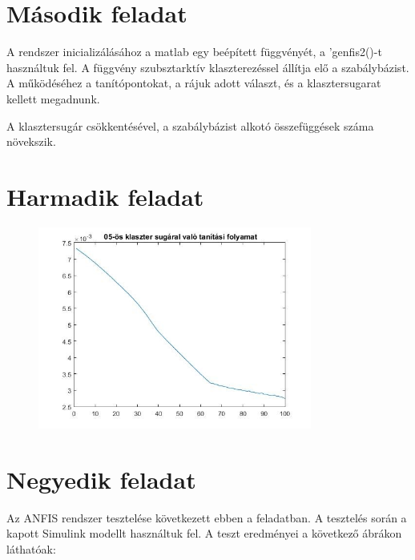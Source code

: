 \section{Második feladat}
A rendszer inicializálásához a matlab egy beépített függvényét, a ’genfis2()-t használtuk fel. A függvény szubsztarktív klaszterezéssel állítja elő a szabálybázist. A működéséhez a tanítópontokat, a rájuk adott választ, és a klasztersugarat kellett megadnunk.

A klasztersugár csökkentésével, a szabálybázist alkotó összefüggések száma növekszik. 



\section{Harmadik feladat}


\begin{figure}[!h]
	\centering
	\includegraphics[width=90mm, keepaspectratio]{figures/m05/3.jpg}
\end{figure}


\section{Negyedik feladat}

Az ANFIS rendszer tesztelése következett ebben a feladatban. A tesztelés során a kapott Simulink modellt használtuk fel. A teszt eredményei a következő ábrákon láthatóak:

